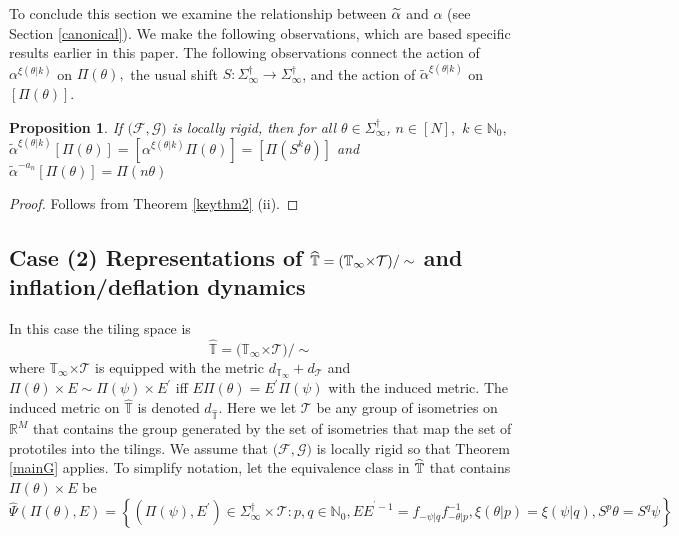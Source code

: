 \documentclass{amsproc}
\theoremstyle{plain}
\newtheorem{proposition}{Proposition}
\theoremstyle{definition}
\numberwithin{equation}{section}
\begin{document}
To conclude this section we examine the relationship between $\widetilde{%
\alpha}$ and $\alpha$ (see Section \ref{canonical}). We make the following
observations, which are based specific results earlier in this paper. The
following observations connect the action of $\alpha^{\xi (\theta|k)}$ on $%
\Pi(\theta),$ the usual shift $S:\Sigma_{\infty}^{\dag
}\rightarrow\Sigma_{\infty}^{\dag}$, and the action of $\widetilde{\alpha }%
^{\xi(\theta|k)}$ on $\left[ \Pi(\theta)\right] $.

\begin{proposition}
If $(\mathcal{F},\mathcal{G)}$ is locally rigid, then for all $\theta\in
\Sigma_{\infty}^{\dag}$, $n\in\left[ N\right] ,$ $k\in\mathbb{N}_{0},$ $%
\widetilde{\alpha}^{\xi(\theta|k)}\left[ \Pi(\theta)\right] =\left[
\alpha^{\xi(\theta|k)}\Pi(\theta)\right] =\left[ \Pi(S^{k}\theta)\right] $
and $\widetilde{\alpha}^{-a_{n}}\left[ \Pi(\theta)\right] =\Pi(n\theta)$
\end{proposition}

\begin{proof}
Follows from Theorem \ref{keythm2} (ii).
\end{proof}

\subsection{Case (2) Representations of $\protect\widehat{\mathbb{T}}=(%
\mathbb{T}_{\infty}\mathbb{\times}\mathcal{T)}/\sim$ and inflation/deflation
dynamics}

In this case the tiling space is 
\begin{equation*}
\widehat{\mathbb{T}}=(\mathbb{T}_{\infty}\mathbb{\times}\mathcal{T)}/\sim
\end{equation*}
where $\mathbb{T}_{\infty}\mathbb{\times}\mathcal{T}$ is equipped with the
metric $d_{\mathbb{T}_{\infty}}+d_{\mathcal{T}}$ and $\Pi(\theta)\times
E\sim\Pi(\psi)\times E^{\prime}$ iff $E\Pi(\theta)=E^{\prime}\Pi(\psi)$ with
the induced metric. The induced metric on $\widehat{\mathbb{T}}$ is denoted $%
d_{\widehat{\mathbb{T}}}$. Here we let $\mathcal{T}$ be any group of
isometries on $\mathbb{R}^{M}$ that contains the group generated by the set
of isometries that map the set of prototiles into the tilings. We assume
that $(\mathcal{F},\mathcal{G)}$ is locally rigid so that Theorem \ref{mainG}
applies. To simplify notation, let the equivalence class in $\widehat{%
\mathbb{T}}$ that contains $\Pi(\theta)\times E$ be 
\begin{equation*}
\widehat{\Psi}(\Pi(\theta),E)=\left\{ \left( \Pi(\psi),E^{\prime}\right)
\in\Sigma_{\infty}^{\dag}\times\mathcal{T}:p,q\in\mathbb{N}_{0},EE^{^{\prime
}-1}=f_{-\psi|q}f_{-\theta|p}^{-1},\xi(\theta|p)=\xi(\psi|q),S^{p}\theta
=S^{q}\psi\right\}
\end{equation*}
\end{document}
